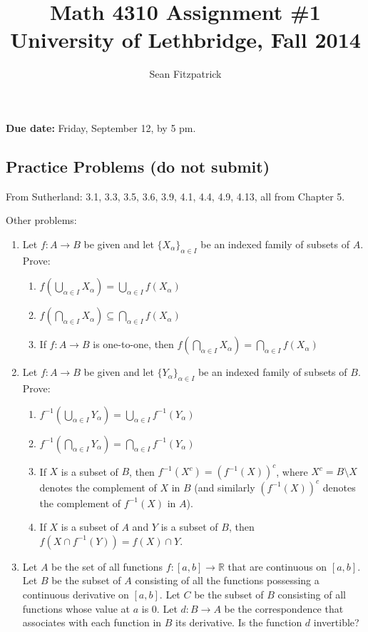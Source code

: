 \documentclass[letterpaper,12pt]{article}
\title{Math 4310 Assignment \#1\\University of Lethbridge, Fall 2014}
\author{Sean Fitzpatrick}
\newcommand{\R}{\mathbb{R}}
\begin{document}
 \maketitle

{\bf Due date:} Friday, September 12, by 5 pm.

\bigskip

\subsection*{Practice Problems (do not submit)}
From Sutherland: 3.1, 3.3, 3.5, 3.6, 3.9, 4.1, 4.4, 4.9, 4.13, all from Chapter 5.

Other problems:
\begin{enumerate}
 \item Let $f:A\to B$ be given and let $\{X_\alpha\}_{\alpha\in I}$ be an indexed family of subsets of $A$. Prove:
\begin{enumerate}
 \item $f(\bigcup_{\alpha\in I}X_\alpha) = \bigcup_{\alpha\in I}f(X_\alpha)$
 \item $f(\bigcap_{\alpha\in I} X_\alpha)\subseteq \bigcap_{\alpha\in I}f(X_\alpha)$ 
 \item If $f:A\to B$ is one-to-one, then $f(\bigcap_{\alpha\in I} X_\alpha)= \bigcap_{\alpha\in I}f(X_\alpha)$
\end{enumerate}
 \item Let $f:A\to B$ be given and let $\{Y_\alpha\}_{\alpha\in I}$ be an indexed family of subsets of $B$. Prove:
\begin{enumerate}
 \item $f^{-1}(\bigcup_{\alpha\in I} Y_\alpha) = \bigcup_{\alpha\in I} f^{-1}(Y_{\alpha})$
 \item $f^{-1}(\bigcap_{\alpha\in I}Y_\alpha) = \bigcap_{\alpha\in I}f^{-1}(Y_\alpha)$
 \item If $X$ is a subset of $B$, then $f^{-1}(X^c) = (f^{-1}(X))^c$, where $X^c = B\setminus X$ denotes the complement of $X$ in $B$ (and similarly $(f^{-1}(X))^c$ denotes the complement of $f^{-1}(X)$ in $A$).
 \item If $X$ is a subset of $A$ and $Y$ is a subset of $B$, then $f(X\cap f^{-1}(Y)) = f(X)\cap Y$.
\end{enumerate}
 \item Let $A$ be the set of all functions $f:[a,b]\to\R$ that are continuous on $[a,b]$. Let $B$ be the subset of $A$ consisting of all the functions possessing a continuous derivative on $[a,b]$. Let $C$ be the subset of $B$ consisting of all functions whose value at $a$ is 0. Let $d:B\to A$ be the correspondence that associates with each function in $B$ its derivative. Is the function $d$ invertible?


\end{enumerate}
\end{document}
